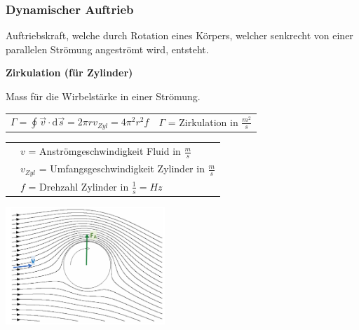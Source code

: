 		\subsubsection{Dynamischer Auftrieb}
				\newline
				Auftriebskraft, welche durch Rotation eines Körpers, welcher senkrecht von einer parallelen Strömung angeströmt wird, entsteht.
				\newline
				\newline
				\begin{minipage}[t]{13cm}
					\textbf{Zirkulation (für Zylinder)}
						\begin{flushleft}
							Mass für die Wirbelstärke in einer Strömung.
						\end{flushleft}
						\renewcommand{\arraystretch}{2.5}
						\begin{tabular}{ p{5cm} | p{7cm}}
							$\Gamma = \oint \vec{v} \cdot \mathrm{d} \vec{s} = 2 \pi r v_{Zyl} = 4 \pi^2 r^2 f$	&	$\Gamma$ = Zirkulation in $\frac{m^2}{s}$\\
						\end{tabular}
						\renewcommand{\arraystretch}{1.5}
						\begin{tabular}{ p{5cm} | p{7cm} }
							& $v$ = Anströmgeschwindigkeit Fluid in $\frac{m}{s}$\\
							& $v_{Zyl}$ = Umfangsgeschwindigkeit Zylinder in $\frac{m}{s}$\\
							& $f$ = Drehzahl Zylinder in $\frac{1}{s} = Hz$\\
						\end{tabular} 
						\renewcommand{\arraystretch}{1}
				\end{minipage}
				\begin{minipage}[t]{10cm}
					\vspace{-\ht\strutbox}\includegraphics[width=6cm]{./bilder/MagnusEffekt.png}
				\end{minipage}
